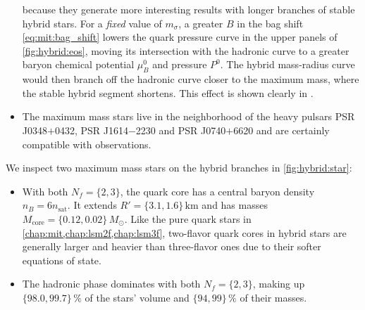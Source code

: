\begin{itemize}
      because they generate more interesting results with longer branches of stable hybrid stars.
      For a \emph{fixed} value of $m_\sigma$,
      a greater $B$ in the bag shift \eqref{eq:mit:bag_shift}
      lowers the quark pressure curve in the upper panels of \cref{fig:hybrid:eos},
      moving its intersection with the hadronic curve to a greater baryon chemical potential $\mu_B^0$ and pressure $P^0$.
      The hybrid mass-radius curve would then branch off the hadronic curve closer to the maximum mass,
      where the stable hybrid segment shortens.
      This effect is shown clearly in \cite[figure 14]{ref:lsm3f_hybrid_stars}.
\item The maximum mass stars live in the neighborhood of the heavy pulsars PSR J0348$+$0432, PSR J1614$-$2230 and PSR J0740$+$6620 and are certainly compatible with observations.
\end{itemize}

We inspect two maximum mass stars on the hybrid branches in \cref{fig:hybrid:star}:
\begin{itemize}
\item With both $N_f=\{2,3\}$, the quark core has a central baryon density $n_B = 6 n_\text{sat}$.
      It extends $R' = \{3.1,1.6\} \, \si{\kilo\meter}$ and has masses $M_\text{core} = \{0.12,0.02\} \, M_\odot$.
      Like the pure quark stars in \cref{chap:mit,chap:lsm2f,chap:lsm3f},
      two-flavor quark cores in hybrid stars are generally larger and heavier than three-flavor ones
      due to their softer equations of state.
\item The hadronic phase dominates with both $N_f=\{2,3\}$, 
      making up $\{98.0,99.7\} \, \si{\percent}$ of the stars' volume and $\{94,99\} \, \si{\percent}$ of their masses.
\end{itemize}

